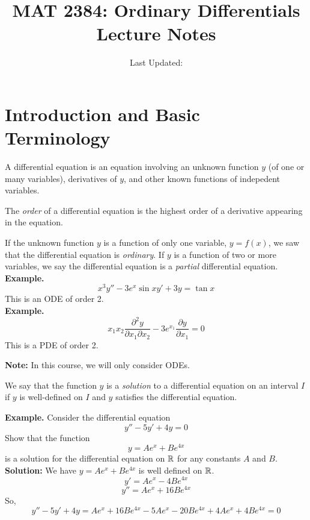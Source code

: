 \documentclass[openany]{report}
\title{MAT 2384: Ordinary Differentials Lecture Notes}
\author{Last Updated:}
\begin{document}
\maketitle

\tableofcontents
\setcounter{chapter}{-1}
\chapter{Introduction and Basic Terminology}
\begin{definition}
    A differential equation is an equation involving an unknown function $y$ (of one or many variables), derivatives of $y$, and other known functions of indepedent variables.
\end{definition}
\begin{definition}
    The \emph{order} of a differential equation is the highest order of a derivative appearing in the equation.
\end{definition}
If the unknown function $y$ is a function of only one variable, $y = f(x)$, we saw that the differential equation is \emph{ordinary}. If $y$ is a function of two or more variables, we say the differential equation is a \emph{partial} differential equation. \\[2ex]
\textbf{Example.}
\[x^3y'' - 3e^x \sin x y' + 3y = \tan x\]
This is an ODE of order 2. \\[2ex]
\textbf{Example.}
\[x_1x_2 \frac{\partial^2y}{\partial x_1\partial x_2} - 3e^{x_1} \frac{\partial y}{\partial x_1} = 0\]
This is a PDE of order 2. \\[2ex]
\begin{center}
    \textbf{Note:} In this course, we will only consider ODEs.
\end{center}
\begin{definition}
    We say that the function $y$ is a \emph{solution} to a differential equation on an interval $I$ if $y$ is well-defined on $I$ and $y$ satisfies the differential equation.
\end{definition}
\textbf{Example.} Consider the differential equation 
\[y'' - 5y' + 4y = 0\]
Show that the function 
\[y = Ae^x + Be^{4x}\]
is a solution for the differential equation on $\mathbb{R}$ for any constants $A$ and $B$. \\[2ex]
\textbf{Solution:} We have $y = Ae^x + Be^{4x}$ is well defined on $\mathbb{R}$. 
\[y' = Ae^x - 4Be^{4x}\]
\[y'' = Ae^x + 16Be^{4x}\]
So, 
    \[y'' - 5y' + 4y = Ae^x + 16Be^{4x} - 5Ae^x - 20Be^{4x} + 4Ae^x + 4Be^{4x} = 0\]
\end{document}
